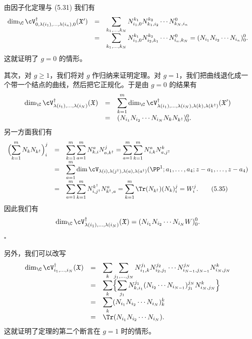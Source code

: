 由因子化定理与 (5.31) 我们有
\[
\begin{array}{rcl}
\dim_{\C}\cV^\dagger_{0,\lambda(i_1),\dots,\lambda(i_n),0}(\mathfrak X')
&=& \displaystyle\sum_{k_1,\dots,k_N}N^{k_1}_{i_1,0}N^{k_2}_{k_1,i_2}\cdots N^{0}_{k_N,i_n}\\[10pt]
&=& \displaystyle\sum_{k_1,\dots,k_N}N^{k_1}_{i_1,0}N^{k_2}_{i_2,k_1}\cdots N^{0}_{i_n,k_N}
=(N_{i_1}N_{i_2}\cdots N_{i_n})^0_0.
\end{array}
\]
这就证明了 $g=0$ 的情形。

其次，对 $g\ge1$，我们将对 $g$ 作归纳来证明定理。对 $g=1$，我们把曲线退化成一个带一个结点的曲线，然后把它正规化。于是由 $g=0$ 的结果有
\[
\begin{array}{rcl}
\dim_{\C}\cV^\dagger_{\lambda(i_1),\dots,\lambda(i_N)}(\mathfrak X)
&=& \displaystyle\sum_{k=1}^{m}\dim_{\C}\cV^\dagger_{\lambda(i_1),\dots,\lambda(i_N),\lambda(k),\lambda(k^\dagger)}(\mathfrak X')\\[10pt]
&=& (N_{i_1}N_{i_2}\cdots N_{i_N}N_kN_{k^\dagger})^0_0.
\end{array}
\]
另一方面我们有
\[
\begin{array}{rcl}
\Bigl(\displaystyle\sum_{k=1}^{m}N_kN_{k^\dagger}\Bigr)^j_i
&=& \displaystyle\sum_{k=1}^{m}\sum_{a=1}^{m}N^a_{k,i}N^j_{a,k^\dagger}
=\sum_{a=1}^{m}\sum_{k=1}^{m}N^a_{i,k}N^k_{a,j^\dagger}\\[10pt]
&=& \displaystyle\sum_{a=1}^{m}\dim\cV_{\lambda(i),\lambda(j^\dagger),\lambda(a),\lambda(a^\dagger)}
(\PP^1;a_1,\dots,a_4;z-a_1,\dots,z-a_4)\\[10pt]
&=& \displaystyle\sum_{a=1}^{m}\sum_{k=1}^{m}N^{k^\dagger}_{i,j^\dagger}N^a_{k^\dagger,a}
=\sum_{k=1}^{m}\Tr(N_{k^\dagger})(N_k)^j_i=W^j_i. \tag{5.35}
\end{array}
\]
因此我们有
\[
\dim_{\C}\cV^\dagger_{\lambda(i_1),\dots,\lambda(i_N)}(\mathfrak X)
=(N_{i_1}N_{i_2}\cdots N_{i_N}W)^0_0.
\]
\hfill$\square$


另外，我们可以改写
\[
\begin{array}{rcl}
\dim_{\C}\cV^\dagger_{i_1,\dots,i_N}(\mathfrak X)
&=&\displaystyle\sum_{k}\sum_{j_1,\dots,j_N}
N^{j_1}_{i_1,k}N^{j_2}_{i_2,j_1}\cdots N^{j_N}_{i_{N-1},j_{N-1}}N^{k}_{i_N,j_N}\\[10pt]
&=&\displaystyle\sum_{k}\Bigl\{\sum_{j_1}N^{j_1}_{k,i_1}
(N_{i_2}\cdots N_{i_{N-1}})^{j_N}_{j_1}N^{k}_{i_N,j_N}\Bigr\}\\[10pt]
&=&\displaystyle\sum_{k}(N_{i_1}N_{i_2}\cdots N_{i_N})^{k}_{k}\\[10pt]
&=&\Tr(N_{i_1}N_{i_2}\cdots N_{i_N}).
\end{array}
\]
这就证明了定理的第二个断言在 $g=1$ 时的情形。

